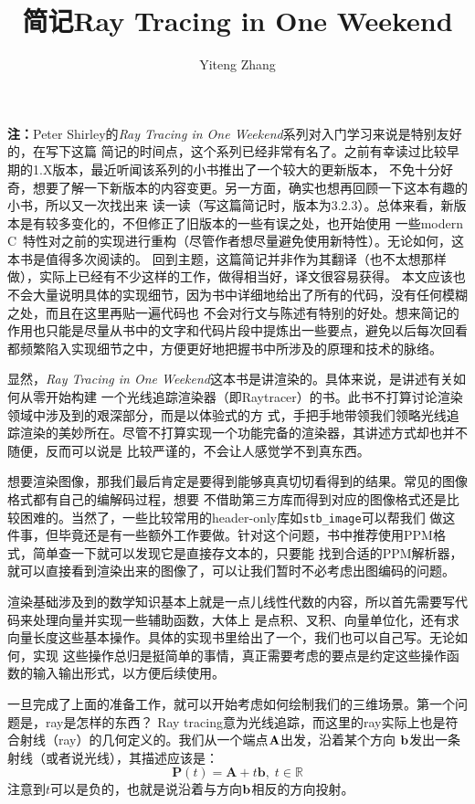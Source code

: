 \documentclass[12pt]{article}
\title{简记Ray Tracing in One Weekend}
\author{Yiteng Zhang}
\newcommand{\CC}{C\nolinebreak\hspace{-.05em}\raisebox{.4ex}{\tiny\bf +}%
\nolinebreak\hspace{-.10em}\raisebox{.4ex}{\tiny\bf +}}
\begin{document}
\maketitle

\noindent{}\textbf{注：}Peter Shirley的\textit{Ray Tracing in One Weekend}系列对入门学习来说是特别友好的，在写下这篇
简记的时间点，这个系列已经非常有名了。之前有幸读过比较早期的1.X版本，最近听闻该系列的小书推出了一个较大的更新版本，
不免十分好奇，想要了解一下新版本的内容变更。另一方面，确实也想再回顾一下这本有趣的小书，所以又一次找出来
读一读（写这篇简记时，版本为3.2.3）。总体来看，新版本是有较多变化的，不但修正了旧版本的一些有误之处，也开始使用
一些modern {\CC}\,特性对之前的实现进行重构（尽管作者想尽量避免使用新特性）。无论如何，这本书是值得多次阅读的。
回到主题，这篇简记并非作为其翻译（也不太想那样做），实际上已经有不少这样的工作，做得相当好，译文很容易获得。
本文应该也不会大量说明具体的实现细节，因为书中详细地给出了所有的代码，没有任何模糊之处，而且在这里再贴一遍代码也
不会对行文与陈述有特别的好处。想来简记的作用也只能是尽量从书中的文字和代码片段中提炼出一些要点，避免以后每次回看
都频繁陷入实现细节之中，方便更好地把握书中所涉及的原理和技术的脉络。

\medskip
\indent{}显然，\textit{Ray Tracing in One Weekend}这本书是讲渲染的。具体来说，是讲述有关如何从零开始构建
一个光线追踪渲染器（即Raytracer）的书。此书不打算讨论渲染领域中涉及到的艰深部分，而是以体验式的方
式，手把手地带领我们领略光线追踪渲染的美妙所在。尽管不打算实现一个功能完备的渲染器，其讲述方式却也并不随便，反而可以说是
比较严谨的，不会让人感觉学不到真东西。

\indent{}想要渲染图像，那我们最后肯定是要得到能够真真切切看得到的结果。常见的图像格式都有自己的编解码过程，想要
不借助第三方库而得到对应的图像格式还是比较困难的。当然了，一些比较常用的header-only库如\texttt{stb\_image}可以帮我们
做这件事，但毕竟还是有一些额外工作要做。针对这个问题，书中推荐使用PPM格式，简单查一下就可以发现它是直接存文本的，只要能
找到合适的PPM解析器，就可以直接看到渲染出来的图像了，可以让我们暂时不必考虑出图编码的问题。

\indent{}渲染基础涉及到的数学知识基本上就是一点儿线性代数的内容，所以首先需要写代码来处理向量并实现一些辅助函数，大体上
是点积、叉积、向量单位化，还有求向量长度这些基本操作。具体的实现书里给出了一个，我们也可以自己写。无论如何，实现
这些操作总归是挺简单的事情，真正需要考虑的要点是约定这些操作函数的输入输出形式，以方便后续使用。

\indent{}一旦完成了上面的准备工作，就可以开始考虑如何绘制我们的三维场景。第一个问题是，ray是怎样的东西？
Ray tracing意为光线追踪，而这里的ray实际上也是符合射线（ray）的几何定义的。我们从一个端点$\bf{A}$出发，沿着某个方向
$\bf{b}$发出一条射线（或者说光线），其描述应该是：
\begin{equation}
\label{equ:ray}
\mathbf{P}(t) = \mathbf{A} + t\mathbf{b},\; t\in\mathbb{R}
\end{equation}
\noindent{}注意到$t$可以是负的，也就是说沿着与方向$\bf{b}$相反的方向投射。
\end{document}
